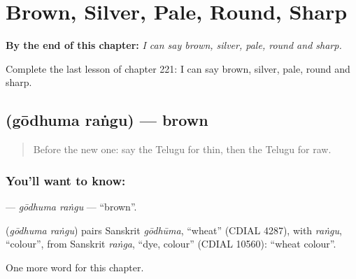 
\chapter{Brown, Silver, Pale, Round, Sharp}
\label{ch:te-brown-silver-pale-round-sharp}

\begin{chapteropening}
\textbf{By the end of this chapter:} \emph{I can say brown, silver, pale, round and sharp.}

Complete the last lesson of chapter 221: I can say brown, silver, pale, round and sharp.
\end{chapteropening}

\section[\texorpdfstring{\te{గోధుమ} \te{రంగు} (gōdhuma raṅgu)}{గోధుమ రంగు (gōdhuma raṅgu)}]{  (gōdhuma raṅgu) — brown}

\label{lesson:TE-C221-godhuma-rangu}



\begin{quote}
Before the new one: say the Telugu for thin, then the Telugu for raw.
\end{quote}

\subsection*{You'll want to know:  }
\textbf{ } — \emph{gōdhuma raṅgu} — \textquotedblleft{}brown\textquotedblright{}.

\begin{cousinweb}
\textbf{ } (\emph{gōdhuma raṅgu}) pairs Sanskrit \emph{gōdhūma}, \textquotedblleft{}wheat\textquotedblright{} (CDIAL 4287), with \emph{raṅgu}, \textquotedblleft{}colour\textquotedblright{}, from Sanskrit \emph{raṅga}, \textquotedblleft{}dye, colour\textquotedblright{} (CDIAL 10560): \textquotedblleft{}wheat colour\textquotedblright{}.
\end{cousinweb}

\begin{grammarlens}[title={What you've built}]
One more word for this chapter.
\end{grammarlens}

